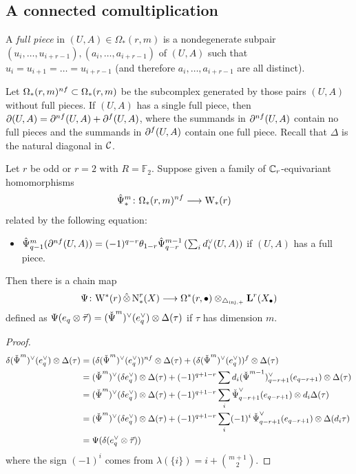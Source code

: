 \subsection{A connected comultiplication} A \emph{full piece} in $(U,A)\in \Omega_*(r,m)$ is a nondegenerate subpair $(u_i,\ldots,u_{i+r-1}),(a_i,\ldots,a_{i+r-1})$ of $(U,A)$ such that $u_i = u_{i+1} = \ldots = u_{i+r-1}$ (and therefore $a_i,\ldots,a_{i+r-1}$ are all distinct).

Let $\Omega_*(r,m)^{nf}\subset \Omega_*(r,m)$ be the subcomplex generated by those pairs $(U,A)$ without full pieces. If $(U,A)$ has a single full piece, then $\partial(U,A) = \partial^{nf}(U,A) + \partial^{f}(U,A)$, where the summands in $\partial^{nf}(U,A)$ contain no full pieces and the summands in $\partial^{f}(U,A)$ contain one full piece. Recall that $\Delta$ is the natural diagonal in $\mathcal{C}$.

\begin{proposition} \label{prop:omegarm}
	Let $r$ be odd or $r=2$ with $R=\mathbb{F}_2$. Suppose given a family of $\mathbb{C}_r$-equivariant homomorphisms
	\begin{align*}
		\hat{\Psi}_*^m\colon \Omega_*(r,m)^{nf}&\longrightarrow \mathrm{W}_*(r)
	\end{align*}
	related by the following equation:
	\begin{itemize}
		\item \label{it:1a}
		$\hat{\Psi}^m_{q-1}(\partial^{nf} (U,A)) = (-1)^{q-r}\theta_{1-r}\hat{\Psi}^{m-1}_{q-r}\left(\sum_i d_i^\vee(U,A)\right)$
		if $(U,A)$ has a full piece.
	\end{itemize}
	Then there is a chain map
	\[
	\Psi\colon \mathrm{W}^*(r)\operatorname{\hat{\otimes}} \operatorname{N}^r_*(X)\longrightarrow \Omega^*(r,\bullet)\otimes_{\triangle_{\mathrm{inj},+}} \operatorname{\mathbf{L}}^r(X_\bullet)
	\]
	defined as $\Psi(e_q\otimes \vec{\tau}) = (\operatorname{\check{\Psi}}^m)^\vee(e_q^\vee)\otimes \Delta(\tau)$ if $\tau$ has dimension $m$.
\end{proposition}
\def\diaglin{\Delta}

\begin{proof}
	\begin{align*}
		\delta(\Psiom^m)^{\vee}(e_q^\vee)\otimes \diaglin(\tau)
		&= (\delta(\Psiom^m)^{\vee}(e_q^\vee))^{\nf}\otimes\diaglin(\tau) + (\delta(\Psiom^m)^{\vee}(e_q^\vee))^{\f}\otimes\diaglin(\tau) \\
		&= (\Psiom^m)^{\vee}(\delta e_q^\vee)\otimes \diaglin(\tau) + (-1)^{q+1-r}\sum d_i(\Psiom^{m-1})^\vee_{q-r+1}(e_{q-r+1})\otimes\diaglin(\tau) \\
		&= (\Psiom^m)^{\vee}(\delta e_q^\vee)\otimes \diaglin(\tau) + (-1)^{q+1-r}\sum_i \Psiom^\vee_{q-r+1}(e_{q-r+1})\otimes d_i\diaglin(\tau) \\
		&= (\Psiom^m)^{\vee}(\delta e_q^\vee)\otimes \diaglin(\tau) + (-1)^{q+1-r}\sum_i (-1)^i\Psiom^\vee_{q-r+1}(e_{q-r+1})\otimes \diaglin(d_i\tau) \\
		&= \Psi(\delta(e_q^\vee\otimes \vec{\tau}))
	\end{align*}
	where the sign $(-1)^i$ comes from $\lambda(\{i\}) = i + \binom{m+1}{2}$.
\end{proof}


